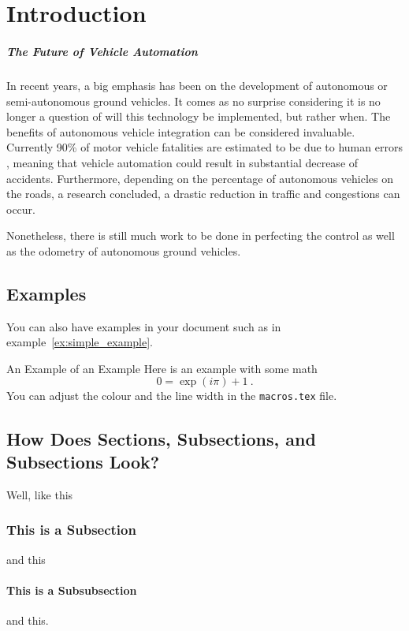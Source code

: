 \chapter{Introduction}\label{ch:introduction}

\paragraph{The Future of Vehicle Automation} 

In recent years, a big emphasis has been on the development of autonomous or semi-autonomous ground vehicles. It comes as no surprise considering it is no longer a question of will this technology be implemented, but rather when. The benefits of autonomous vehicle integration can be considered invaluable. Currently 90\% of motor vehicle fatalities are estimated to be due to human errors , meaning that vehicle automation could result in substantial decrease of accidents. Furthermore, depending on the percentage of autonomous vehicles on the roads, a research concluded, a drastic reduction in traffic and congestions can occur. 

Nonetheless, there is still much work to be done in perfecting the control as well as the odometry of autonomous ground vehicles. 


\section{Examples}
You can also have examples in your document such as in example~\ref{ex:simple_example}.
\begin{example}{An Example of an Example}
  \label{ex:simple_example}
  Here is an example with some math
  \begin{equation}
    0 = \exp(i\pi)+1\ .
  \end{equation}
  You can adjust the colour and the line width in the {\tt macros.tex} file.
\end{example}

\section{How Does Sections, Subsections, and Subsections Look?}
Well, like this
\subsection{This is a Subsection}
and this
\subsubsection{This is a Subsubsection}
and this.

